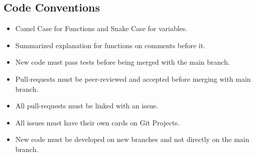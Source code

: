 \documentclass{article}
\begin{document}
\subsection{Code Conventions}

\vspace{0.5cm}

\begin{itemize}
  \item Camel Case for Functions and Snake Case for variables.
  \item Summarized explanation for functions on comments before it.
  \item New code must pass tests before being merged with the main branch.
  \item Pull-requests must be peer-reviewed and accepted before merging with main branch.
  \item All pull-requests must be linked with an issue.
  \item All issues must have their own cards on Git Projects.
  \item New code must be developed on new branches and not directly on the main branch.
\end{itemize}
\end{document}

